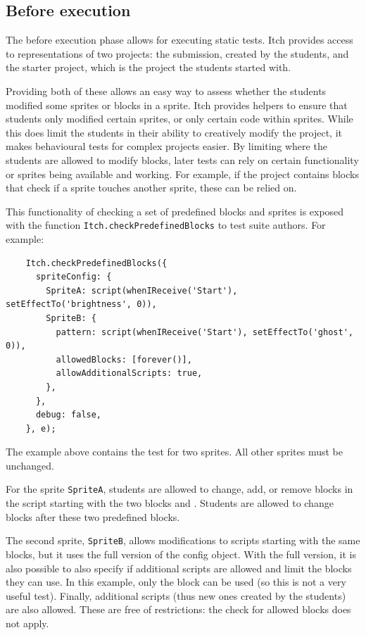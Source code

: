 \documentclass[../main]{subfiles}
\begin{document}
\subsection{Before execution}\label{subsec:before-execution}

The before execution phase allows for executing static tests.
Itch provides access to representations of two projects: the submission, created by the students, and the starter project, which is the project the students started with.

Providing both of these allows an easy way to assess whether the students modified some sprites or blocks in a sprite.
Itch provides helpers to ensure that students only modified certain sprites, or only certain code within sprites.
While this does limit the students in their ability to creatively modify the project, it makes behavioural tests for complex projects easier.
By limiting where the students are allowed to modify blocks, later tests can rely on certain functionality or sprites being available and working.
For example, if the project contains blocks that check if a sprite touches another sprite, these can be relied on.

This functionality of checking a set of predefined blocks and sprites is exposed with the function \texttt{Itch.checkPredefinedBlocks} to test suite authors.
For example:

\begin{verbatim}
    Itch.checkPredefinedBlocks({
      spriteConfig: {
        SpriteA: script(whenIReceive('Start'), setEffectTo('brightness', 0)),
        SpriteB: {
          pattern: script(whenIReceive('Start'), setEffectTo('ghost', 0)),
          allowedBlocks: [forever()],
          allowAdditionalScripts: true,
        },
      },
      debug: false,
    }, e);
\end{verbatim}

The example above contains the test for two sprites.
All other sprites must be unchanged.

For the sprite \texttt{SpriteA}, students are allowed to change, add, or remove blocks in the script starting with the two blocks  and .
Students are allowed to change blocks after these two predefined blocks.

The second sprite, \texttt{SpriteB}, allows modifications to scripts starting with the same blocks, but it uses the full version of the config object.
With the full version, it is also possible to also specify if additional scripts are allowed and limit the blocks they can use.
In this example, only the  block can be used (so this is not a very useful test).
Finally, additional scripts (thus new ones created by the students) are also allowed.
These are free of restrictions: the check for allowed blocks does not apply.
\end{document}
